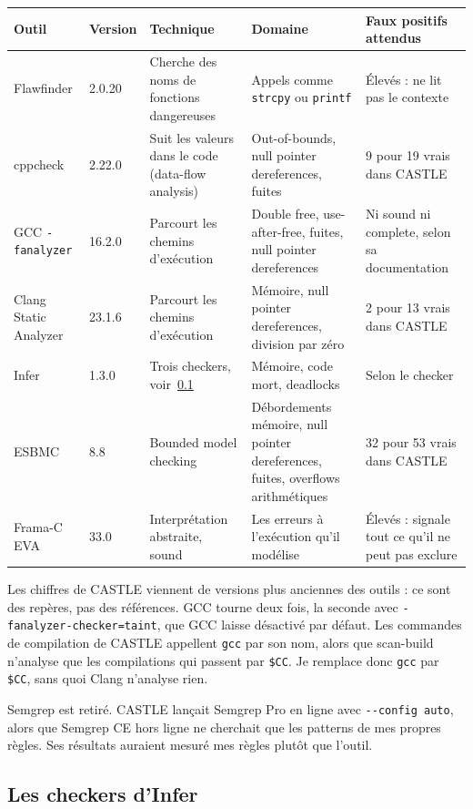 \documentclass[11pt,a4paper]{article}
\begin{document}
\smallskip
\begin{tabular}{@{}L{26mm}L{14mm}L{36mm}L{36mm}L{40mm}@{}}
\toprule
Outil & Version & Technique & Domaine & Faux positifs attendus \\
\midrule
Flawfinder & 2.0.20 & Cherche des noms de fonctions dangereuses & Appels comme \texttt{strcpy} ou \texttt{printf} & Élevés : ne lit pas le contexte \\
cppcheck & 2.22.0 & Suit les valeurs dans le code (data-flow analysis) & Out-of-bounds, null pointer dereferences, fuites & 9 pour 19 vrais dans CASTLE \\
GCC \texttt{-fanalyzer} & 16.2.0 & Parcourt les chemins d'exécution & Double free, use-after-free, fuites, null pointer dereferences & Ni sound ni complete, selon sa documentation \\
Clang Static Analyzer & 23.1.6 & Parcourt les chemins d'exécution & Mémoire, null pointer dereferences, division par zéro & 2 pour 13 vrais dans CASTLE \\
Infer & 1.3.0 & Trois checkers, voir~\ref{sec:infer} & Mémoire, code mort, deadlocks & Selon le checker \\
ESBMC & 8.8 & Bounded model checking & Débordements mémoire, null pointer dereferences, fuites, overflows arithmétiques & 32 pour 53 vrais dans CASTLE \\
Frama-C EVA & 33.0 & Interprétation abstraite, sound & Les erreurs à l'exécution qu'il modélise & Élevés : signale tout ce qu'il ne peut pas exclure \\
\bottomrule
\end{tabular}

\smallskip
Les chiffres de CASTLE viennent de versions plus anciennes des outils : ce sont des repères, pas des références.
GCC tourne deux fois, la seconde avec \texttt{-fanalyzer-checker=taint}, que GCC laisse désactivé par défaut.
Les commandes de compilation de CASTLE appellent \texttt{gcc} par son nom, alors que scan-build n'analyse que les
compilations qui passent par \texttt{\$CC}. Je remplace donc \texttt{gcc} par \texttt{\$CC}, sans quoi Clang
n'analyse rien.

Semgrep est retiré. CASTLE lançait Semgrep Pro en ligne avec \texttt{-{}-config auto}, alors que Semgrep CE hors
ligne ne cherchait que les patterns de mes propres règles. Ses résultats auraient mesuré mes règles plutôt que
l'outil.

\subsection{Les checkers d'Infer}\label{sec:infer}
\end{document}
